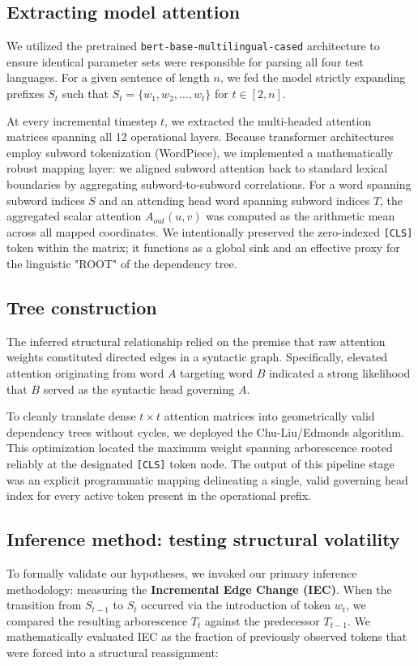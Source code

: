 \documentclass[11pt,a4paper]{article}
\begin{document}
\subsection{Extracting model attention}
We utilized the pretrained \texttt{bert-base-multilingual-cased} architecture to ensure identical parameter sets were responsible for parsing all four test languages. For a given sentence of length $n$, we fed the model strictly expanding prefixes $S_t$ such that $S_t = \{w_1, w_2, \dots, w_t\}$ for $t \in [2, n]$. 

At every incremental timestep $t$, we extracted the multi-headed attention matrices spanning all 12 operational layers. Because transformer architectures employ subword tokenization (WordPiece), we implemented a mathematically robust mapping layer: we aligned subword attention back to standard lexical boundaries by aggregating subword-to-subword correlations. For a word spanning subword indices $S$ and an attending head word spanning subword indices $T$, the aggregated scalar attention $A_{out}(u,v)$ was computed as the arithmetic mean across all mapped coordinates. We intentionally preserved the zero-indexed \texttt{[CLS]} token within the matrix; it functions as a global sink and an effective proxy for the linguistic "ROOT" of the dependency tree.

\subsection{Tree construction}
The inferred structural relationship relied on the premise that raw attention weights constituted directed edges in a syntactic graph. Specifically, elevated attention originating from word $A$ targeting word $B$ indicated a strong likelihood that $B$ served as the syntactic head governing $A$.

To cleanly translate dense $t \times t$ attention matrices into geometrically valid dependency trees without cycles, we deployed the Chu-Liu/Edmonds algorithm. This optimization located the maximum weight spanning arborescence rooted reliably at the designated \texttt{[CLS]} token node. The output of this pipeline stage was an explicit programmatic mapping delineating a single, valid governing head index for every active token present in the operational prefix.

\subsection{Inference method: testing structural volatility}
To formally validate our hypotheses, we invoked our primary inference methodology: measuring the \textbf{Incremental Edge Change (IEC)}. When the transition from $S_{t-1}$ to $S_t$ occurred via the introduction of token $w_t$, we compared the resulting arborescence $T_t$ against the predecessor $T_{t-1}$. We mathematically evaluated IEC as the fraction of previously observed tokens that were forced into a structural reassignment:
\end{document}
